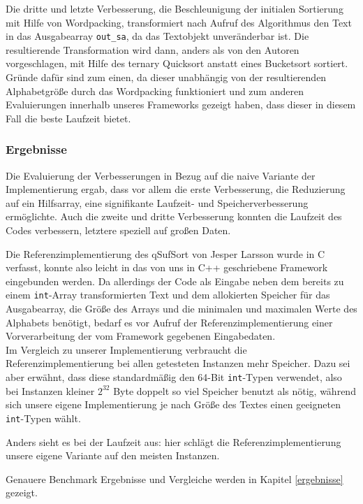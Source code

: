 Die dritte und letzte Verbesserung, die Beschleunigung der initialen Sortierung mit Hilfe von Wordpacking, transformiert nach Aufruf des Algorithmus den Text in das Ausgabearray \texttt{out_sa}, da das Textobjekt unveränderbar ist. Die resultierende Transformation wird dann, anders als von den Autoren vorgeschlagen, mit Hilfe des ternary Quicksort anstatt eines Bucketsort sortiert. Gründe dafür sind zum einen, da dieser unabhängig von der resultierenden Alphabetgröße durch das Wordpacking funktioniert und zum anderen Evaluierungen innerhalb unseres Frameworks gezeigt haben, dass dieser in diesem Fall die beste Laufzeit bietet.
\subsubsection{Ergebnisse}
Die Evaluierung der Verbesserungen in Bezug auf die naive Variante der Implementierung ergab, dass vor allem die erste Verbesserung, die Reduzierung auf ein Hilfsarray, eine signifikante Laufzeit- und Speicherverbesserung ermöglichte.
Auch die zweite und dritte Verbesserung konnten die Laufzeit des Codes verbessern, letztere speziell auf großen Daten.

Die Referenzimplementierung des qSufSort von Jesper Larsson wurde in C verfasst, konnte also leicht in das von uns in C++ geschriebene Framework eingebunden werden. Da allerdings der Code als Eingabe neben dem bereits zu einem \texttt{int}-Array transformierten Text und dem allokierten Speicher für das Ausgabearray, die Größe des Arrays und die minimalen und maximalen Werte des Alphabets benötigt, bedarf es vor Aufruf der Referenzimplementierung einer Vorverarbeitung der vom Framework gegebenen Eingabedaten. \\
Im Vergleich zu unserer Implementierung verbraucht die Referenzimplementierung bei allen getesteten Instanzen mehr Speicher. Dazu sei aber erwähnt, dass diese standardmäßig den 64-Bit \texttt{int}-Typen verwendet, also bei Instanzen kleiner $2^{32}$ Byte doppelt so viel Speicher benutzt als nötig, während sich unsere eigene Implementierung je nach Größe des Textes einen geeigneten \texttt{int}-Typen wählt. 

Anders sieht es bei der Laufzeit aus: hier schlägt die Referenzimplementierung unsere eigene Variante auf den meisten Instanzen. 

Genauere Benchmark Ergebnisse und Vergleiche werden in Kapitel \ref{ergebnisse} gezeigt.